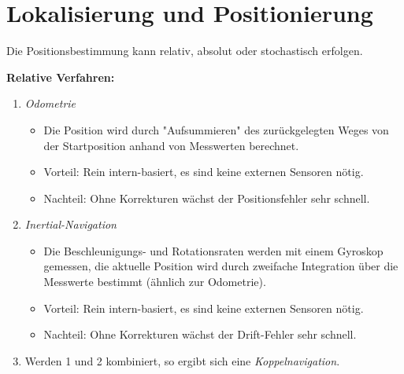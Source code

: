 	\section{Lokalisierung und Positionierung}
		Die Positionsbestimmung kann relativ, absolut oder stochastisch erfolgen.

		\textbf{Relative Verfahren:}
		\begin{enumerate}
			\item \emph{Odometrie}
				\begin{itemize}
					\item Die Position wird durch "Aufsummieren" des zurückgelegten Weges von der Startposition anhand von Messwerten berechnet.
					\item Vorteil: Rein intern-basiert, \dh es sind keine externen Sensoren nötig.
					\item Nachteil: Ohne Korrekturen wächst der Positionsfehler sehr schnell.
				\end{itemize}
			\item \emph{Inertial-Navigation}
				\begin{itemize}
					\item Die Beschleunigungs- und Rotationsraten werden mit einem Gyroskop gemessen, die aktuelle Position wird durch zweifache Integration über die Messwerte bestimmt (ähnlich zur Odometrie).
					\item Vorteil: Rein intern-basiert, \dh es sind keine externen Sensoren nötig.
					\item Nachteil: Ohne Korrekturen wächst der Drift-Fehler sehr schnell.
				\end{itemize}
			\item[] Werden 1 und 2 kombiniert, so ergibt sich eine \emph{Koppelnavigation}.
		\end{enumerate}

